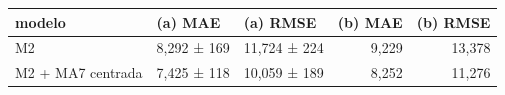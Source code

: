 \begin{tabular}{lllrr}
\toprule
modelo & (a) MAE & (a) RMSE & (b) MAE & (b) RMSE \\
\midrule
M2 & 8,292 ± 169 & 11,724 ± 224 & 9,229 & 13,378 \\
M2 + MA7 centrada & 7,425 ± 118 & 10,059 ± 189 & 8,252 & 11,276 \\
\bottomrule
\end{tabular}